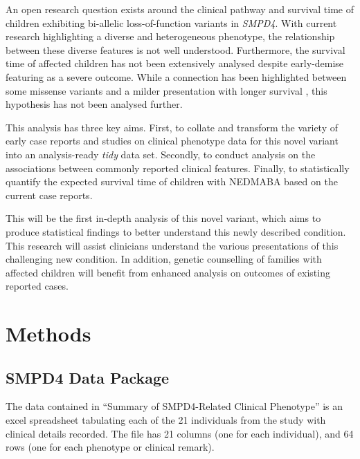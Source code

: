 \documentclass[
  authoryear,
  preprint,
  3p]{elsarticle}
\begin{document}
An open research question exists around the clinical pathway and
survival time of children exhibiting bi-allelic loss-of-function
variants in \emph{SMPD4}. With current research highlighting a diverse
and heterogeneous phenotype, the relationship between these diverse
features is not well understood. Furthermore, the survival time of
affected children has not been extensively analysed despite early-demise
featuring as a severe outcome. While a connection has been highlighted
between some missense variants and a milder presentation with longer
survival \citep{magini2019loss}, this hypothesis has not been analysed
further.

This analysis has three key aims. First, to collate and transform the
variety of early case reports and studies on clinical phenotype data for
this novel variant into an analysis-ready \emph{tidy} data set.
Secondly, to conduct analysis on the associations between commonly
reported clinical features. Finally, to statistically quantify the
expected survival time of children with NEDMABA based on the current
case reports.

This will be the first in-depth analysis of this novel variant, which
aims to produce statistical findings to better understand this newly
described condition. This research will assist clinicians understand the
various presentations of this challenging new condition. In addition,
genetic counselling of families with affected children will benefit from
enhanced analysis on outcomes of existing reported cases.

\hypertarget{methods}{%
\section{Methods}\label{methods}}

\hypertarget{smpd4-data-package}{%
\subsection{SMPD4 Data Package}\label{smpd4-data-package}}

The data contained in \citet{magini2019loss} ``Summary of SMPD4-Related
Clinical Phenotype'' is an excel spreadsheet tabulating each of the 21
individuals from the study with clinical details recorded. The file has
21 columns (one for each individual), and 64 rows (one for each
phenotype or clinical remark).
\end{document}
